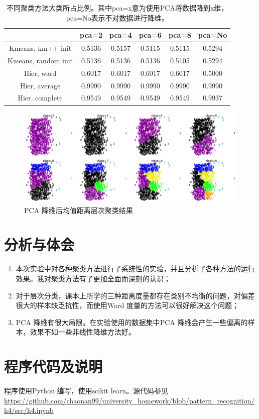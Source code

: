 \begin{table}[htbp]
\centering
\begin{tabular}{cccccc}
\toprule
{} &   pca=2 &   pca=4 &   pca=6 &   pca=8 &  pca=No \\
\midrule
Kmeans, km++ init   &  0.5136 &  0.5157 &  0.5115 &  0.5115 &  0.5294 \\
Kmeans, random init &  0.5136 &  0.5136 &  0.5136 &  0.5105 &  0.5294 \\
Hier, ward          &  0.6017 &  0.6017 &  0.6017 &  0.6017 &  0.5000 \\
Hier, average       &  0.9990 &  0.9990 &  0.9990 &  0.9990 &  0.9990 \\
Hier, complete      &  0.9549 &  0.9549 &  0.9549 &  0.9549 &  0.9937 \\
\bottomrule
\end{tabular}
\caption{不同聚类方法大类所占比例。其中pca=x意为使用PCA将数据降到x维，pca=No表示不对数据进行降维。}
\label{tab:prop}
\end{table}

\begin{figure}
\centering
\includegraphics[width=15cm]{resource/pca_dec.png}
\caption{{\ttfamily PCA} 降维后均值距离层次聚类结果}
\label{fig:pca_dec}
\end{figure}

\section{分析与体会}
\begin{enumerate}
\item 本次实验中对各种聚类方法进行了系统性的实验，并且分析了各种方法的运行效果。我对聚类方法有了更加全面而深刻的认识；
\item 对于层次分类，课本上所学的三种距离度量都存在类别不均衡的问题，对偏差很大的样本缺乏抗性，而使用{\ttfamily Ward} 度量的方法可以很好解决这个问题；
\item {\ttfamily PCA} 降维有很大局限。在实验使用的数据集中{\ttfamily PCA} 降维会产生一些偏离的样本，效果不如一些非线性降维方法好。
\end{enumerate}

\section{程序代码及说明}
程序使用{\ttfamily Python} 编写，使用{\ttfamily scikit learn}。源代码参见 \url{https://github.com/chaonan99/university_homework/blob/pattern_recognition/h4/src/h4.ipynb}


